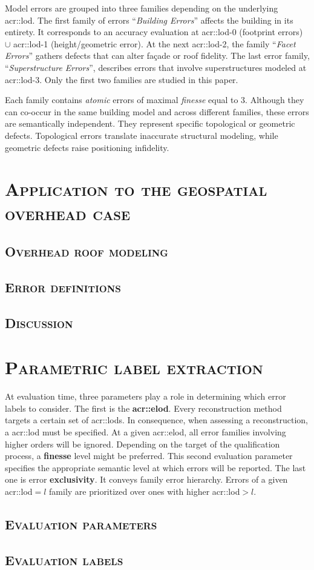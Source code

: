         Model errors are grouped into three families depending on the underlying \gls{acr::lod}.
        The first family of errors ``\textit{Building Errors}'' affects the building in its entirety.
        It corresponds to an accuracy evaluation at \gls{acr::lod}-0 (footprint errors) $\cup$ \gls{acr::lod}-1 (height/geometric error).
        At the next \gls{acr::lod}-2, the family ``\textit{Facet Errors}'' gathers defects that can alter fa\c{c}ade or roof fidelity.
        The last error family, ``\textit{Superstructure Errors}'', describes errors that involve superstructures modeled at \gls{acr::lod}-3.
        Only the first two families are studied in this paper.

        Each family contains \textit{atomic} errors of maximal \textit{finesse} equal to 3.
        Although they can co-occur in the same building model and across different families, these errors are semantically independent.
        They represent specific topological or geometric defects.
        Topological errors translate inaccurate structural modeling, while geometric defects raise positioning infidelity.

\section{\textsc{Application to the geospatial overhead case}}
    \subsection{\textsc{Overhead roof modeling}}
    \subsection{\textsc{Error definitions}}
    \subsection{\textsc{Discussion}}

\section{\textsc{Parametric label extraction}}
    At evaluation time, three parameters play a role in determining which error labels to consider.
    The first is the \textbf{\gls{acr::elod}}. Every reconstruction method targets a certain set of \glspl*{acr::lod}.
    In consequence, when assessing a reconstruction, a \gls{acr::lod} must be specified. At a given \gls{acr::elod}, all error families involving higher orders will be ignored.
    Depending on the target of the qualification process, a \textbf{finesse} level might be preferred.
    This second evaluation parameter specifies the appropriate semantic level at which errors will be reported.
    The last one is error \textbf{exclusivity}. It conveys family error hierarchy. Errors of a given \gls{acr::lod}$ = l$ family are prioritized over ones with higher \gls{acr::lod}$ > l$.

    \subsection{\textsc{Evaluation parameters}}
    \subsection{\textsc{Evaluation labels}}
